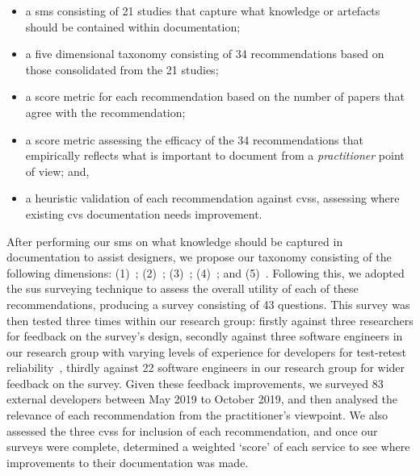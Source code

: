 \begin{itemize}
  \item a \gls{sms} consisting of 21 studies that capture what knowledge or artefacts should be contained within  documentation;
  \item a five dimensional taxonomy consisting of 34 recommendations based on those consolidated from the 21 studies;
  \item a score metric for each recommendation based on the number of papers that agree with the recommendation;
  \item a score metric assessing the efficacy of the 34 recommendations that empirically reflects what is important to document from a \textit{practitioner} point of view; and,
  \item a heuristic validation of each recommendation against \glspl{cvs}, assessing where existing \gls{cvs}  documentation needs improvement.
\end{itemize}

After performing our \gls{sms} on what  knowledge should be captured in documentation to assist  designers, we propose our taxonomy consisting of the following dimensions: (1)~\dima{}; (2)~\dimb{}; (3)~\dimc{}; (4)~\dimd{}; and (5)~\dime{}. Following this, we adopted the \gls{sus} surveying technique to assess the overall utility of each of these recommendations, producing a survey consisting of 43 questions. This survey was then tested three times within our research group: firstly against three researchers for feedback on the survey's design, secondly against three software engineers in our research group with varying levels of experience for developers for test-retest reliability~\citep{Kitchenham:2007ux}, thirdly against 22 software engineers in our research group for wider feedback on the survey. Given these feedback improvements, we surveyed 83 external developers between May 2019 to October 2019, and then analysed the relevance of each recommendation from the practitioner's viewpoint. We also assessed the three \glspl{cvs} for inclusion of each recommendation, and once our surveys were complete, determined a weighted `score' of each service to see where improvements to their documentation was made.

